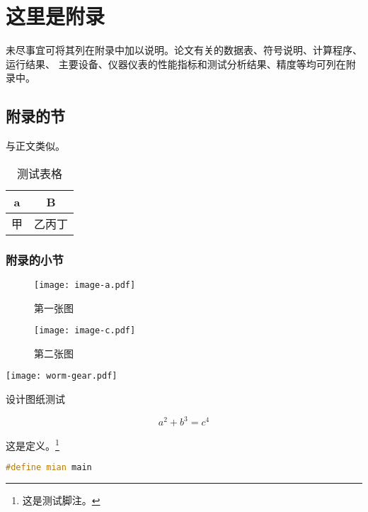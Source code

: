 \chapter{这里是附录}\label{app:1}
未尽事宜可将其列在附录中加以说明。论文有关的数据表、符号说明、计算程序、运行结果、
主要设备、仪器仪表的性能指标和测试分析结果、精度等均可列在附录中。
\section{附录的节}
与正文类似。
\begin{table}[ht]
	\centering
	\caption{测试表格}\label{tab:mytable}
	\begin{tabular}{cc}
		\toprule
		a & B   \\
		\midrule
		甲   & 乙丙丁 \\
		\bottomrule
	\end{tabular}
\end{table}

\subsection{附录的小节}
\zhlipsum[1][name = zhufu]

\begin{figure}[ht]
	\centering
	\begin{minipage}{0.4\textwidth}
		\centering
		\texttt{[image: image-a.pdf]}
		\caption{第一张图}\label{fig:test1}
	\end{minipage}
	\hspace{1cm}
	\begin{minipage}{0.4\textwidth}
		\centering
		\texttt{[image: image-c.pdf]}
		\caption{第二张图}\label{fig:test2}
	\end{minipage}
\end{figure}

\zhlipsum[name = xiangyu]

\begin{dfigure}[tbp]
	\centering\texttt{[image: worm-gear.pdf]}
	\caption{设计图纸测试}
\end{dfigure}

\zhlipsum[1][name = aspirin]

\begin{equation}
	a^2+b^3=c^4
\end{equation}

\begin{definition}
	这是定义。\footnote{这是测试脚注。}
\end{definition}

\begin{lstlisting}[language=c++,caption=一个测试,label=mycode]
#define mian main
	\end{lstlisting}

